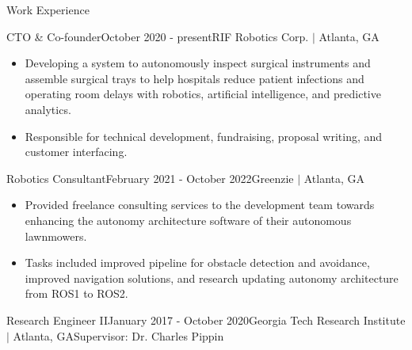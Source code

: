 \documentclass{resume} %
\newcommand{\sectionspace}{\vspace{3mm}}
\begin{document}

\sectionspace
\begin{rSection}{Work Experience}

\begin{rSubsection}{CTO \& Co-founder}{October 2020 - present}{RIF Robotics Corp. $\vert$ Atlanta, GA}{}

\item
\begin{itemize}
\item Developing a system to autonomously inspect surgical instruments and
  assemble surgical trays to help hospitals reduce patient infections and
  operating room delays with robotics, artificial intelligence, and predictive
  analytics.

\item Responsible for technical development, fundraising, proposal writing, and
  customer interfacing.
\end{itemize}

\end{rSubsection}


\begin{rSubsection}{Robotics Consultant}{February 2021 - October 2022}{Greenzie $\vert$ Atlanta, GA}{}

\item
\begin{itemize}
\item Provided freelance consulting services to the development team towards
  enhancing the autonomy architecture software of their autonomous lawnmowers.

\item Tasks included improved pipeline for obstacle detection and avoidance,
  improved navigation solutions, and research updating autonomy architecture
  from ROS1 to ROS2.
\end{itemize}

\end{rSubsection}


\begin{rSubsection}{Research Engineer II}{January 2017 - October 2020}{Georgia Tech Research Institute $\vert$ Atlanta, GA}{Supervisor: Dr. Charles Pippin}


\end{rSubsection}
\end{rSection}
\end{document}

